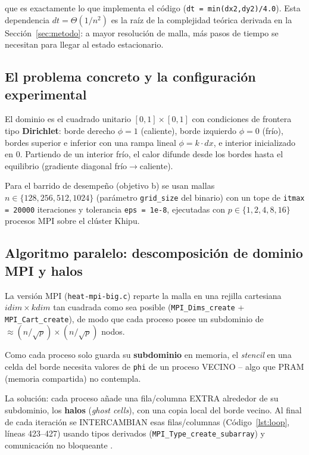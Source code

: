 \documentclass[11pt,a4paper]{article}
\begin{document}
	que es exactamente lo que implementa el código (\texttt{dt = min(dx2,dy2)/4.0}).
	Esta dependencia $dt=\Theta(1/n^2)$ es la raíz de la complejidad teórica derivada
	en la Sección~\ref{sec:metodo}: a mayor resolución de malla, más pasos de tiempo
	se necesitan para llegar al estado estacionario.

	\subsection{El problema concreto y la configuración experimental}

	El dominio es el cuadrado unitario $[0,1]\times[0,1]$ con condiciones de frontera
	tipo \textbf{Dirichlet}: borde derecho $\phi=1$ (caliente), borde izquierdo
	$\phi=0$ (frío), bordes superior e inferior con una rampa lineal $\phi = k\cdot dx$,
	e interior inicializado en $0$. Partiendo de un interior frío, el calor difunde
	desde los bordes hasta el equilibrio (gradiente diagonal frío$\to$caliente).

	Para el barrido de desempeño (objetivo b) se usan mallas
	\textbf{$n \in \{128,256,512,1024\}$} (parámetro \texttt{grid\_size} del binario)
	con un tope de \texttt{itmax = 20000} iteraciones y tolerancia
	\texttt{eps = 1e-8}, ejecutadas con
	\textbf{$p \in \{1,2,4,8,16\}$} procesos MPI sobre el clúster Khipu.

	\subsection{Algoritmo paralelo: descomposición de dominio MPI y halos}
	\label{sec:algoritmo}
	\enlargethispage{3 \baselineskip}
	La versión MPI (\texttt{heat-mpi-big.c}) reparte la malla en una rejilla cartesiana
	$idim \times kdim$ tan cuadrada como sea posible (\texttt{MPI\_Dims\_create} +
	\texttt{MPI\_Cart\_create}), de modo que cada proceso posee un subdominio de
	$\approx (n/\sqrt{p}) \times (n/\sqrt{p})$ nodos.

	Como cada proceso solo guarda su \textbf{subdominio} en memoria, el
	\textit{stencil} en una celda del borde necesita valores de \texttt{phi} de
	un proceso VECINO -- algo que PRAM (memoria compartida) no contempla.
	
	La solución: cada proceso añade una fila/columna EXTRA alrededor de su
	subdominio, los \textbf{halos} (\textit{ghost cells}), con una copia local
	del borde vecino. Al final de cada iteración se INTERCAMBIAN esas
	filas/columnas (Código~\ref{lst:loop}, líneas 423--427) usando tipos
	derivados (\texttt{MPI\_Type\_create\_subarray}) y comunicación no bloqueante
	\cite{gropp-mpi}.
\end{document}
